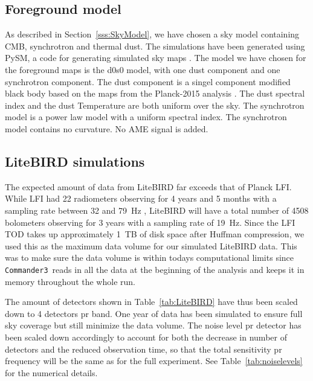 \documentclass[twocolumn]{aa}
\def\commanderthree{\texttt{Commander3}}
\begin{document}
\subsection{Foreground model}
\label{ss:Foreground}

As described in Section~\ref{sss:SkyModel}, we have chosen a sky model containing CMB, synchrotron and thermal dust. The simulations have been generated using PySM, a code for generating simulated sky maps \cite{PySM}. The model we have chosen for the foreground maps is the d0s0 model, with one dust component and one synchrotron component. The dust component is a singel component modified black body based on the maps from the Planck-2015 analysis \citep{Planck2015}. The dust spectral index and the dust Temperature are both uniform over the sky. The synchrotron model is a power law model with a uniform spectral index. The synchrotron model contains no curvature. No AME signal is added. 



\subsection{LiteBIRD simulations}
\label{ss:LB_sims}

The expected amount of data from LiteBIRD far exceeds that of Planck LFI. While LFI had 22 radiometers observing for 4 years and 5 months with a sampling rate between 32 and 79~Hz \citep{planck2016-l01}, LiteBIRD will have a total number of 4508 bolometers observing for 3 years with a sampling rate of 19~Hz. Since the LFI TOD takes up approximately 1~TB of disk space after Huffman compression, we used this as the maximum data volume for our simulated LiteBIRD data. This was to make sure the data volume is within todays computational limits since \commanderthree\ reads in all the data at the beginning of the analysis and keeps it in memory throughout the whole run.

The amount of detectors shown in Table~\ref{tab:LiteBIRD} have thus been scaled down to 4 detectors pr band. One year of data has been simulated to ensure full sky coverage but still minimize the data volume. The noise level pr detector has been scaled down accordingly to account for both the decrease in number of detectors and the reduced observation time, so that the total sensitivity pr frequency will be the same as for the full experiment. See Table~\ref{tab:noiselevels} for the numerical details. 
\end{document}
